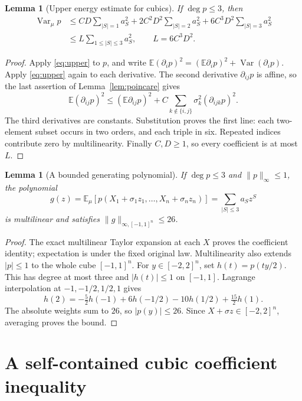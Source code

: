 \documentclass[11pt]{article}
\newtheorem{lemma}[theorem]{Lemma}
\newcommand{\E}{\mathbb E}
\newcommand{\Var}{\operatorname{Var}}
\begin{document}
\begin{lemma}[Upper energy estimate for cubics]\label{lem:energy}
If $\deg p\le3$, then
\begin{align}
 \Var_\mu p
 &\le CD\sum_{|S|=1}a_S^2
       +2C^2D^2\sum_{|S|=2}a_S^2
       +6C^3D^2\sum_{|S|=3}a_S^2\nonumber\\
 &\le L\sum_{1\le|S|\le3}a_S^2,
 \qquad L=6C^3D^2.\label{eq:energy}
\end{align}
\end{lemma}
\begin{proof}
Apply \eqref{eq:upper} to $p$, and write
$\E(\partial_i p)^2=(\E\partial_i p)^2+\Var(\partial_i p)$.
Apply \eqref{eq:upper} again to each derivative. The second derivative
$\partial_{ij}p$ is affine, so the last assertion of
Lemma~\ref{lem:poincare} gives
\[
 \E(\partial_{ij}p)^2\le(\E\partial_{ij}p)^2+
 C\sum_{k\notin\{i,j\}}\sigma_k^2(\partial_{ijk}p)^2.
\]
The third derivatives are constants. Substitution proves the first
line: each two-element subset occurs in two orders, and each triple
in six. Repeated indices contribute zero by multilinearity.
Finally $C,D\ge1$, so every coefficient is at most $L$.
\end{proof}

\begin{lemma}[A bounded generating polynomial]\label{lem:generator}
If $\deg p\le3$ and $\|p\|_\infty\le1$, the polynomial
\[
 g(z)=\E_\mu[p(X_1+\sigma_1z_1,\ldots,X_n+\sigma_nz_n)]
      =\sum_{|S|\le3}a_Sz^S
\]
is multilinear and satisfies $\|g\|_{\infty,[-1,1]^n}\le26$.
\end{lemma}
\begin{proof}
The exact multilinear Taylor expansion at each $X$ proves the
coefficient identity; expectation is under the fixed original law.
Multilinearity also extends $|p|\le1$ to the whole cube $[-1,1]^n$.
For $y\in[-2,2]^n$, set $h(t)=p(ty/2)$. This has degree at most
three and $|h(t)|\le1$ on $[-1,1]$. Lagrange interpolation at
$-1,-1/2,1/2,1$ gives
\[
 h(2)=-\tfrac52h(-1)+6h(-1/2)-10h(1/2)+\tfrac{15}2h(1).
\]
The absolute weights sum to $26$, so $|p(y)|\le26$.
Since $X+\sigma z\in[-2,2]^n$, averaging proves the bound.
\end{proof}

\section{A self-contained cubic coefficient inequality}
\end{document}
